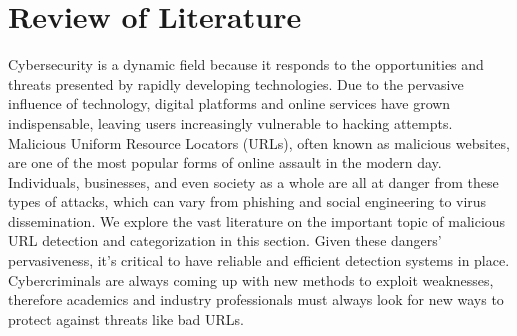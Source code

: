 \def\baselinestretch{1}

\chapter{Review of Literature}
Cybersecurity is a dynamic field because it responds to the opportunities and threats presented by rapidly developing technologies. Due to the pervasive influence of technology, digital platforms and online services have grown indispensable, leaving users increasingly vulnerable to hacking attempts. Malicious Uniform Resource Locators (URLs), often known as malicious websites, are one of the most popular forms of online assault in the modern day. Individuals, businesses, and even society as a whole are all at danger from these types of attacks, which can vary from phishing and social engineering to virus dissemination.
We explore the vast literature on the important topic of malicious URL detection and categorization in this section. Given these dangers' pervasiveness, it's critical to have reliable and efficient detection systems in place. Cybercriminals are always coming up with new methods to exploit weaknesses, therefore academics and industry professionals must always look for new ways to protect against threats like bad URLs.

